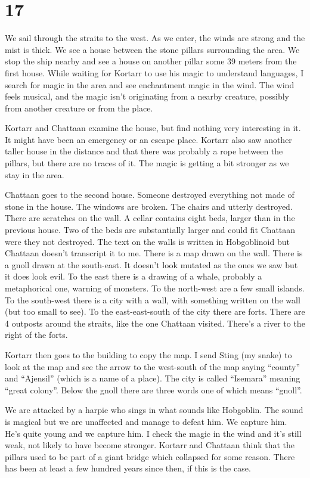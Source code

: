 \documentclass[10pt,a4paper,twoside,openany,hidelinks]{book}
\begin{document}
\chapter*{17}

We sail through the straits to the west. As we enter, the winds are strong and the mist is thick. We see a house between the stone pillars surrounding the area. We stop the ship nearby and see a house on another pillar some 39 meters from the first house. While waiting for Kortarr to use his magic to understand languages, I search for magic in the area and see enchantment magic in the wind. The wind feels musical, and the magic isn't originating from a nearby creature, possibly from another creature or from the place.

Kortarr and Chattaan examine the house, but find nothing very interesting in it. It might have been an emergency or an escape place. Kortarr also saw another taller house in the distance and that there was probably a rope between the pillars, but there are no traces of it. The magic is getting a bit stronger as we stay in the area.

Chattaan goes to the second house. Someone destroyed everything not made of stone in the house. The windows are broken. The chairs and utterly destroyed. There are scratches on the wall. A cellar contains eight beds, larger than in the previous house. Two of the beds are substantially larger and could fit Chattaan were they not destroyed. The text on the walls is written in Hobgoblinoid but Chattaan doesn't transcript it to me. There is a map drawn on the wall. There is a gnoll drawn at the south-east. It doesn't look mutated as the ones we saw but it does look evil. To the east there is a drawing of a whale, probably a metaphorical one, warning of monsters. To the north-west are a few small islands. To the south-west there is a city with a wall, with something written on the wall (but too small to see). To the east-east-south of the city there are forts. There are 4 outposts around the straits, like the one Chattaan visited. There's a river to the right of the forts.

Kortarr then goes to the building to copy the map. I send Sting (my snake) to look at the map and see the arrow to the west-south of the map saying ``county'' and ``Ajensil'' (which is a name of a place). The city is called ``Isemara'' meaning ``great colony''. Below the gnoll there are three words one of which means ``gnoll''.

We are attacked by a harpie who sings in what sounds like Hobgoblin. The sound is magical but we are unaffected and manage to defeat him. We capture him. He's quite young and we capture him. I check the magic in the wind and it's still weak, not likely to have become stronger. Kortarr and Chattaan think that the pillars used to be part of a giant bridge which collapsed for some reason. There has been at least a few hundred years since then, if this is the case.
\end{document}
